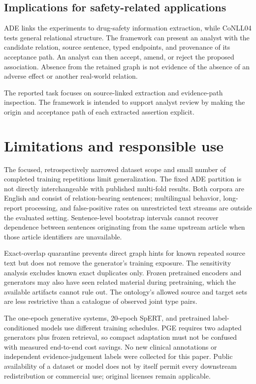 \documentclass[preprint,12pt]{elsarticle}
\begin{document}
\subsection{Implications for safety-related applications}
ADE links the experiments to drug-safety information extraction, while CoNLL04
tests general relational structure. The framework can present an analyst with
the candidate relation, source sentence, typed endpoints, and provenance of
its acceptance path. An analyst can then accept, amend, or reject the proposed
association. Absence from the retained graph is not evidence of the absence
of an adverse effect or another real-world relation.

The reported task focuses on source-linked extraction and evidence-path
inspection. The framework is intended to support analyst review by making the
origin and acceptance path of each extracted assertion explicit.

\section{Limitations and responsible use}
\label{sec:limitations}
The focused, retrospectively narrowed dataset scope and small number of
completed training repetitions limit generalization. The fixed ADE partition is not directly
interchangeable with published multi-fold results. Both corpora are English
and consist of relation-bearing sentences; multilingual behavior, long-report
processing, and false-positive rates on unrestricted text streams are outside
the evaluated setting. Sentence-level bootstrap intervals cannot recover
dependence between sentences originating from the same upstream article when
those article identifiers are unavailable.

Exact-overlap quarantine prevents direct graph hints for known repeated source
text but does not remove the generator's training exposure. The sensitivity
analysis excludes known exact duplicates only. Frozen pretrained encoders and
generators may also have seen related material during pretraining, which the
available artifacts cannot rule out. The ontology's allowed source and target
sets are less restrictive than a catalogue of observed joint type pairs.

The one-epoch generative systems, 20-epoch SpERT, and pretrained label-conditioned
models use different training schedules. PGE requires two adapted
generators plus frozen retrieval, so compact adaptation must not be confused
with measured end-to-end cost savings. No new clinical annotations or
independent evidence-judgement labels were collected for this paper. Public
availability of a dataset or model does not by itself permit every downstream
redistribution or commercial use; original licenses remain applicable.
\end{document}
